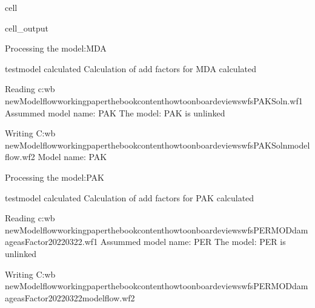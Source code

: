 \documentclass[letterpaper,10pt,english]{jupyterBook}
\begin{document}
\begin{sphinxuseclass}{cell}
\begin{sphinxVerbatimOutput}
\begin{sphinxuseclass}{cell_output}
\begin{sphinxVerbatim}[commandchars=\\\{\}]
Processing the model:MDA
\end{sphinxVerbatim}

\begin{sphinxVerbatim}[commandchars=\\\{\}]
testmodel calculated  
Calculation of add factors for MDA calculated  
\end{sphinxVerbatim}

\begin{sphinxVerbatim}[commandchars=\\\{\}]
Reading c:\PYGZbs{}wb new\PYGZbs{}Modelflow\PYGZbs{}working\PYGZus{}paper\PYGZbs{}thebook\PYGZbs{}content\PYGZbs{}howto\PYGZbs{}onboard\PYGZbs{}eviews\PYGZbs{}wfs\PYGZbs{}PAKSoln.wf1
Assummed model name: PAK
The model: PAK is unlinked 
\end{sphinxVerbatim}

\begin{sphinxVerbatim}[commandchars=\\\{\}]
Writing C:\PYGZbs{}wb new\PYGZbs{}Modelflow\PYGZbs{}working\PYGZus{}paper\PYGZbs{}thebook\PYGZbs{}content\PYGZbs{}howto\PYGZbs{}onboard\PYGZbs{}eviews\PYGZbs{}wfs\PYGZbs{}PAKSoln\PYGZus{}modelflow.wf2
Model name: PAK
\end{sphinxVerbatim}

\begin{sphinxVerbatim}[commandchars=\\\{\}]
Processing the model:PAK
\end{sphinxVerbatim}

\begin{sphinxVerbatim}[commandchars=\\\{\}]
testmodel calculated  
Calculation of add factors for PAK calculated  
\end{sphinxVerbatim}

\begin{sphinxVerbatim}[commandchars=\\\{\}]
Reading c:\PYGZbs{}wb new\PYGZbs{}Modelflow\PYGZbs{}working\PYGZus{}paper\PYGZbs{}thebook\PYGZbs{}content\PYGZbs{}howto\PYGZbs{}onboard\PYGZbs{}eviews\PYGZbs{}wfs\PYGZbs{}PERMOD\PYGZus{}damage\PYGZus{}asFactor20220322.wf1
Assummed model name: PER
The model: PER is unlinked 
\end{sphinxVerbatim}

\begin{sphinxVerbatim}[commandchars=\\\{\}]
Writing C:\PYGZbs{}wb new\PYGZbs{}Modelflow\PYGZbs{}working\PYGZus{}paper\PYGZbs{}thebook\PYGZbs{}content\PYGZbs{}howto\PYGZbs{}onboard\PYGZbs{}eviews\PYGZbs{}wfs\PYGZbs{}PERMOD\PYGZus{}damage\PYGZus{}asFactor20220322\PYGZus{}modelflow.wf2
\end{sphinxVerbatim}


\end{sphinxuseclass}
\end{sphinxVerbatimOutput}
\end{sphinxuseclass}
\end{document}
